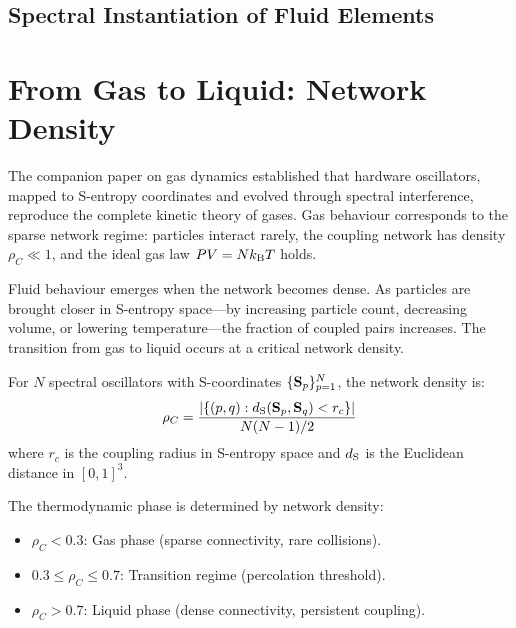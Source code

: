 
\subsection{Spectral Instantiation of Fluid Elements}
\label{part:instantiation}

\section{From Gas to Liquid: Network Density}
\label{sec:network_density}

The companion paper on gas dynamics established that hardware oscillators, mapped to S-entropy coordinates and evolved through spectral interference, reproduce the complete kinetic theory of gases. Gas behaviour corresponds to the sparse network regime: particles interact rarely, the coupling network has density $\rho_C \ll 1$, and the ideal gas law $PV = Nk_{\mathrm{B}} T$ holds.

Fluid behaviour emerges when the network becomes dense. As particles are brought closer in S-entropy space---by increasing particle count, decreasing volume, or lowering temperature---the fraction of coupled pairs increases. The transition from gas to liquid occurs at a critical network density.

\begin{definition}
\label{def:network_density}
For $N$ spectral oscillators with S-coordinates $\{\mathbf{S}_p\}_{p=1}^{N}$, the network density is:
\begin{equation}
    \rho_C = \frac{|\{(p,q) : d_{\mathrm{S}}(\mathbf{S}_p, \mathbf{S}_q) < r_c\}|}{N(N-1)/2}
\end{equation}
where $r_c$ is the coupling radius in S-entropy space and $d_{\mathrm{S}}$ is the Euclidean distance in $[0,1]^3$.
\end{definition}

\begin{theorem}
\label{thm:phase}
The thermodynamic phase is determined by network density:
\begin{itemize}
    \item $\rho_C < 0.3$: Gas phase (sparse connectivity, rare collisions).
    \item $0.3 \leq \rho_C \leq 0.7$: Transition regime (percolation threshold).
    \item $\rho_C > 0.7$: Liquid phase (dense connectivity, persistent coupling).
\end{itemize}
\end{theorem}


